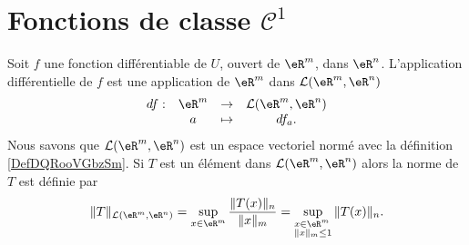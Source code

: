 


\section{Fonctions de classe $\mathcal{C}^1$}

Soit $f$ une fonction différentiable de $U$, ouvert de $\eR^m$, dans $\eR^n$. L'application différentielle de $f$ est une application  de $\eR^m$ dans $\mathcal{L}(\eR^m, \eR^n)$ 
\begin{equation}
  \begin{array}{rccc}
    df : & \eR^m & \to & \mathcal{L}(\eR^m, \eR^n)\\
& a& \mapsto & df_a.
  \end{array}
\end{equation}
Nous savons que $\mathcal{L}(\eR^m, \eR^n)$ est un espace vectoriel normé avec la définition \ref{DefDQRooVGbzSm}. Si $T$ est un élément dans $\mathcal{L}(\eR^m, \eR^n)$ alors la norme de $T$ est définie par 
\[
\|T\|_{\mathcal{L}(\eR^m, \eR^n)}=\sup_{x\in\eR^m} \frac{\|T(x)\|_n}{\|x\|_m}=\sup_{\begin{subarray}{l}
    x\in\eR^m\\
\|x\|_m\leq 1
  \end{subarray}} \|T(x)\|_n.
\]

